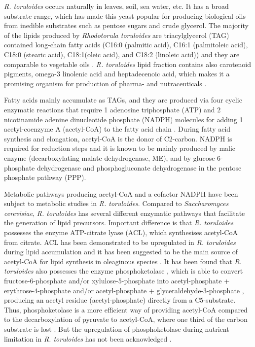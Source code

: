 \textit{R. toruloides} occurs naturally in leaves, soil, sea water, etc. It has a broad substrate range, which has made this yeast popular for producing biological oils from inedible substrates such as pentose sugars and crude glycerol. The majority of the lipids produced by \textit{Rhodotorula toruloides} are triacylglycerol (TAG) contained long-chain fatty acids (C16:0 (palmitic acid), C16:1 (palmitoleic acid), C18:0 (stearic acid), C18:1(oleic acid), and C18:2 (linoleic acid)) and they
are comparable to vegetable oils \cite{Li2007, Vasconcelos2019}.
\textit{R. toruloides} lipid fraction contains also carotenoid pigments, 
omega-3 linolenic acid and heptadecenoic acid,
which makes it a promising organism for production of pharma- and nutraceuticals \cite{Buzzini2007}. 

Fatty acids mainly accumulate as TAGs, and they are produced via four cyclic enzymatic reactions that require 1 adenosine triphosphate (ATP) and 2 nicotinamide adenine dinucleotide phosphate (NADPH) molecules for adding 1 acetyl-coenzyme A (acetyl-CoA) to the fatty acid chain \cite{Lian2015}. During fatty acid synthesis and elongation, acetyl-CoA is the donor of C2-carbon. NADPH is required for reduction steps and it is known to be mainly produced by malic enzyme (decarboxylating malate dehydrogenase, ME), and by glucose 6-phosphate dehydrogenase and phosphogluconate dehydrogenase in the pentose phosphate pathway (PPP). \cite{Tehlivets2007}

Metabolic pathways producing acetyl-CoA and a cofactor NADPH have been subject to metabolic studies in \textit{R. toruloides}. Compared to \textit{Saccharomyces cerevisiae}, \textit{R. toruloides} has several different enzymatic pathways that facilitate the generation of lipid precursors. Important difference is that \textit{R. toruloides} possesses the enzyme ATP-citrate lyase (ACL), which synthesises acetyl-CoA from citrate. ACL has been demonstrated to be upregulated in \textit{R. toruloides} during lipid accumulation \cite{Zhu2012} and it has been suggested to be the main source of acetyl-CoA for lipid synthesis in oleaginous species \cite{Vorapreeda2012}. It has been found that \textit{R. toruloides} also possesses the enzyme phosphoketolase \cite{Tiukova2019a}, which is able to convert fructose-6-phosphate and/or xylulose-5-phosphate into acetyl-phosphate + erythrose-4-phosphate and/or acetyl-phosphate + glyceraldehyde-3-phosphate \cite{Evans1984}, producing an acetyl residue (acetyl-phosphate) directly from a C5-substrate. Thus, phosphoketolase is a more efficient way of providing acetyl-CoA compared to the decarboxylation of pyruvate to acetyl-CoA, where one third of the carbon substrate is lost \cite{Tiukova2019a}.
But the upregulation of phosphoketolase during nutrient limitation in \textit{R. toruloides} has not been acknowledged \cite{Tiukova2019a}.

